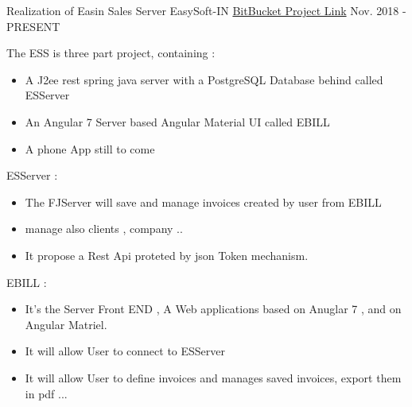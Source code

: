 


\begin{cventries}


\cventry
{Realization of Easin Sales Server } %
{ EasySoft-IN } %
{ \href{https://bitbucket.org/account/user/easysoftin/projects/EAS}{BitBucket Project Link} }%
{Nov. 2018 - PRESENT} %
{ %
\begin{cvitems}
\item {The ESS is three part project, containing :}
\begin{itemize}
\item { A J2ee rest spring java server with a PostgreSQL Database behind called ESServer}
\item { An Angular 7 Server based Angular Material UI called EBILL }
\item { A phone App still to come}
\end{itemize}
\item {  ESServer : }
\begin{itemize}
\item{ The FJServer will save and manage invoices created by user from EBILL}
\item{ manage also clients , company ..}
\item{ It propose a Rest Api proteted by json Token mechanism.}
\end{itemize}
\item {EBILL :}
\begin{itemize}
\item {It's the Server Front END , A Web applications based on Anuglar 7 , and on Angular Matriel.}
\item { It will allow User to connect to ESServer}
\item { It will allow User to define invoices and manages saved invoices, export them in pdf ...}
\end{itemize}
\end{cvitems}
}


\end{cventries}
